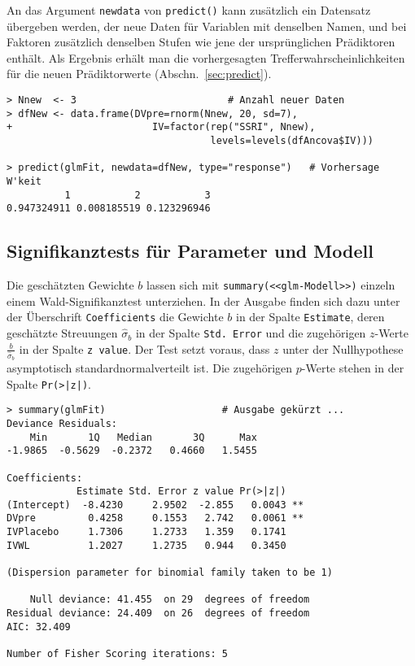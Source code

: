 An das Argument \lstinline!newdata! von \lstinline!predict()! kann zusätzlich ein Datensatz übergeben werden, der neue Daten für Variablen mit denselben Namen, und bei Faktoren zusätzlich denselben Stufen wie jene der ursprünglichen Prädiktoren enthält. Als Ergebnis erhält man die vorhergesagten Trefferwahrscheinlichkeiten für die neuen Prädiktorwerte (Abschn.\ \ref{sec:predict}).
\begin{lstlisting}
> Nnew  <- 3                          # Anzahl neuer Daten
> dfNew <- data.frame(DVpre=rnorm(Nnew, 20, sd=7),
+                        IV=factor(rep("SSRI", Nnew),
                                   levels=levels(dfAncova$IV)))

> predict(glmFit, newdata=dfNew, type="response")   # Vorhersage W'keit
          1           2           3
0.947324911 0.008185519 0.123296946
\end{lstlisting}

\subsection{Signifikanztests für Parameter und Modell}
\label{sec:regrLogTest}

Die geschätzten Gewichte $b$ lassen sich mit \lstinline!summary(<<glm-Modell>>)! einzeln einem Wald-Signifikanztest unterziehen. In der Ausgabe finden sich dazu unter der Überschrift \lstinline!Coefficients! die Gewichte $b$ in der Spalte \lstinline!Estimate!, deren geschätzte Streuungen $\hat{\sigma}_{b}$ in der Spalte \lstinline!Std. Error! und die zugehörigen $z$-Werte $\frac{b}{\hat{\sigma}_{b}}$ in der Spalte \lstinline!z value!. Der Test setzt voraus, dass $z$ unter der Nullhypothese asymptotisch standardnormalverteilt ist. Die zugehörigen $p$-Werte stehen in der Spalte \lstinline!Pr(>|z|)!.
\begin{lstlisting}
> summary(glmFit)                    # Ausgabe gekürzt ...
Deviance Residuals:
    Min       1Q   Median       3Q      Max
-1.9865  -0.5629  -0.2372   0.4660   1.5455

Coefficients:
            Estimate Std. Error z value Pr(>|z|)
(Intercept)  -8.4230     2.9502  -2.855   0.0043 **
DVpre         0.4258     0.1553   2.742   0.0061 **
IVPlacebo     1.7306     1.2733   1.359   0.1741
IVWL          1.2027     1.2735   0.944   0.3450

(Dispersion parameter for binomial family taken to be 1)

    Null deviance: 41.455  on 29  degrees of freedom
Residual deviance: 24.409  on 26  degrees of freedom
AIC: 32.409

Number of Fisher Scoring iterations: 5
\end{lstlisting}


